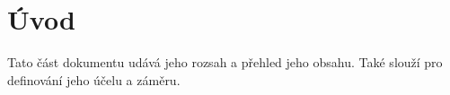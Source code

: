 \documentclass[FM,Proj]{tulthesis}
\begin{document}








\tableofcontents

\clearpage


\chapter{Úvod}
Tato část dokumentu udává jeho rozsah a přehled jeho obsahu. Také slouží pro definování jeho účelu a záměru.


\nocite{*}
\end{document}
